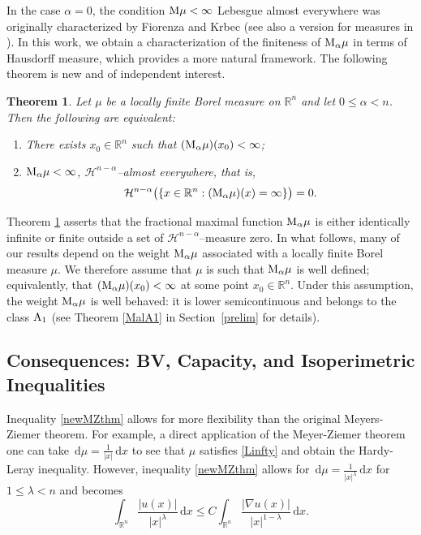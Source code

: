 \documentclass[11pt, a4paper, reqno]{amsart}
\newcommand{\R}{\mathbb R}
\newcommand{\A}{\textup A}
\newcommand{\al}{\alpha}
\newcommand{\dx}{\,{\mathrm dx}}
\newcommand{\dmu}{\,{\mathrm d\mu}}
\newtheorem{theorem}{Theorem}[section]
\theoremstyle{definition}
\theoremstyle{remark}
\begin{document}

In the case $\alpha=0$, the condition $\textup{M}\mu<\infty$ Lebesgue almost everywhere was originally characterized by Fiorenza and Krbec \cite{FK} (see also a version for measures in \cite{BGKM}). In this work, we obtain a characterization of the finiteness of $\textup{M}_\alpha \mu$ in terms of Hausdorff measure, which provides a more natural framework. The following theorem is new and of independent interest.


\begin{theorem} \label{Malfinite}
Let $\mu$ be a locally finite Borel measure on $\R^n$ and let
$0 \le \alpha < n$. Then the following are equivalent:
\begin{enumerate}
\item There exists $x_0 \in \R^n$ such that $(\textup{M}_\alpha \mu)(x_0) < \infty$;
\item $\textup{M}_\alpha \mu < \infty$, $\mathcal H^{n-\alpha}$--almost
everywhere, that is, 
\[
\mathcal H^{n-\alpha}\bigl(\{x \in \R^n : (\textup{M}_\alpha \mu)(x) = \infty\}\bigr) = 0.
\]
\end{enumerate}
\end{theorem}
Theorem \ref{Malfinite} asserts that the fractional maximal function $\textup{M}_\alpha \mu$ is either identically infinite or finite outside a set of $\mathcal H^{n-\alpha}$–measure zero. In what follows, many of our results depend on the weight $\textup{M}_\alpha \mu$ associated with a locally finite Borel measure $\mu$. We therefore assume that $\mu$ is such that $\textup M_\al\mu$ is well defined; equivalently, that $(\textup{M}_\alpha \mu)(x_0)<\infty$ at some point $x_0\in\R^n$. Under this assumption, the weight $\textup{M}_\al\mu$ is well behaved: it is lower semicontinuous and belongs to the class $\A_1$ (see Theorem \ref{MalA1} in Section~\ref{prelim} for details).
\subsection{Consequences: BV, Capacity, and Isoperimetric Inequalities}

Inequality \eqref{newMZthm} allows for more flexibility than the original Meyers-Ziemer theorem.  For example, a direct application of the Meyer-Ziemer theorem one can take $\dmu=\frac1{|x|}\dx$ to see that $\mu$ satisfies \eqref{Linfty} and obtain the Hardy-Leray inequality.  However, inequality \eqref{newMZthm} allows for $\dmu=\frac{1}{|x|^\lambda}\dx$ for $1\leq \lambda<n$ and becomes
$$\int_{\R^n}\frac{|u(x)|}{|x|^\lambda}\dx\leq C\int_{\R^n}\frac{|\nabla u(x)|}{|x|^{1-\lambda}}\dx.$$  
\end{document}
